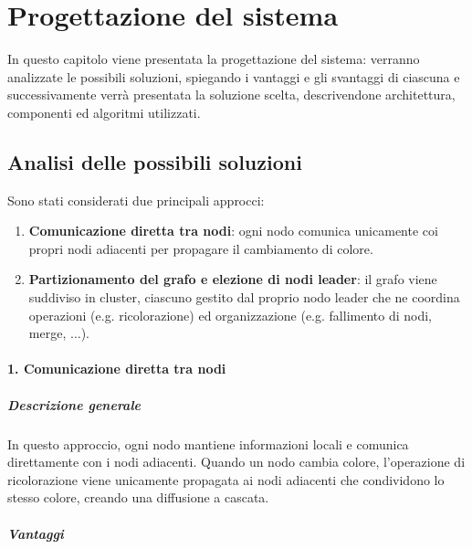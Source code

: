 \documentclass[12pt, a4paper]{report}
\begin{document}
\chapter{Progettazione del sistema}

In questo capitolo viene presentata la progettazione del sistema: verranno analizzate le possibili soluzioni, spiegando i vantaggi e gli svantaggi di ciascuna e successivamente verr\`a presentata la soluzione scelta, descrivendone architettura, componenti ed algoritmi utilizzati.

\section{Analisi delle possibili soluzioni}

Sono stati considerati due principali approcci:

\begin{enumerate}
    \item \textbf{Comunicazione diretta tra nodi}: ogni nodo comunica unicamente coi propri nodi adiacenti per propagare il cambiamento di colore.
    \item \textbf{Partizionamento del grafo e elezione di nodi leader}: il grafo viene suddiviso in cluster, ciascuno gestito dal proprio nodo leader che ne coordina operazioni (e.g. ricolorazione) ed organizzazione (e.g. fallimento di nodi, merge, $\ldots$).
\end{enumerate}

\subsubsection{1. Comunicazione diretta tra nodi}

\paragraph{Descrizione generale}
\begin{flushleft}
In questo approccio, ogni nodo mantiene informazioni locali e comunica direttamente con i nodi adiacenti. Quando un nodo cambia colore, l'operazione di ricolorazione viene unicamente propagata ai nodi adiacenti che condividono lo stesso colore, creando una diffusione a cascata.
\end{flushleft}

\paragraph{Vantaggi}
\end{document}
